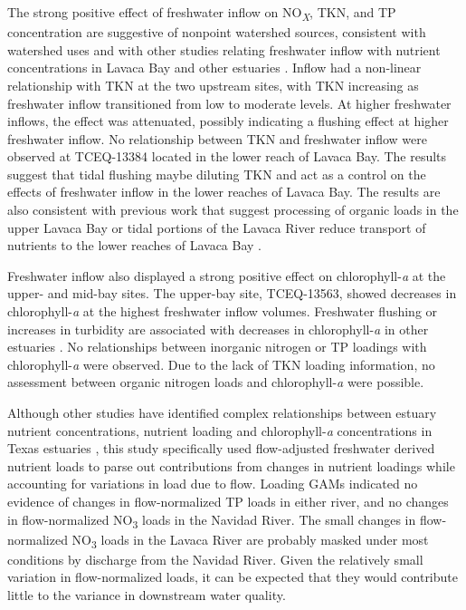 \documentclass[fleqn,10pt,lineno]{wlpeerj} %
\begin{document}
The strong positive effect of freshwater inflow on
NO\textsubscript{\emph{X}}, TKN, and TP concentration are suggestive of
nonpoint watershed sources, consistent with watershed uses and with
other studies relating freshwater inflow with nutrient concentrations in
Lavaca Bay and other estuaries
\autocite{russell_effect_2006,caffreyHighNutrientPulses2007,peierlsNonmonotonicResponsesPhytoplankton2012,palmerImpactsDroughtsLow2015,ciraPhytoplanktonDynamicsLowinflow2021}.
Inflow had a non-linear relationship with TKN at the two upstream sites,
with TKN increasing as freshwater inflow transitioned from low to
moderate levels. At higher freshwater inflows, the effect was
attenuated, possibly indicating a flushing effect at higher freshwater
inflow. No relationship between TKN and freshwater inflow were observed
at TCEQ-13384 located in the lower reach of Lavaca Bay. The results
suggest that tidal flushing maybe diluting TKN and act as a control on
the effects of freshwater inflow in the lower reaches of Lavaca Bay. The
results are also consistent with previous work that suggest processing
of organic loads in the upper Lavaca Bay or tidal portions of the Lavaca
River reduce transport of nutrients to the lower reaches of Lavaca Bay
\autocite{russell_effect_2006}.

Freshwater inflow also displayed a strong positive effect on
chlorophyll-\emph{a} at the upper- and mid-bay sites. The upper-bay
site, TCEQ-13563, showed decreases in chlorophyll-\emph{a} at the
highest freshwater inflow volumes. Freshwater flushing or increases in
turbidity are associated with decreases in chlorophyll-\emph{a} in other
estuaries
\autocite{peierlsNonmonotonicResponsesPhytoplankton2012,cloernPhytoplanktonPrimaryProduction2014}.
No relationships between inorganic nitrogen or TP loadings with
chlorophyll-\emph{a} were observed. Due to the lack of TKN loading
information, no assessment between organic nitrogen loads and
chlorophyll-\emph{a} were possible.

Although other studies have identified complex relationships between
estuary nutrient concentrations, nutrient loading and
chlorophyll-\emph{a} concentrations in Texas estuaries
\autocite{ornolfsdottirNutrientPulsingRegulator2004,doradoUnderstandingInteractionsFreshwater2015,ciraPhytoplanktonDynamicsLowinflow2021,tominackVariabilityPhytoplanktonBiomass2022},
this study specifically used flow-adjusted freshwater derived nutrient
loads to parse out contributions from changes in nutrient loadings while
accounting for variations in load due to flow. Loading GAMs indicated no
evidence of changes in flow-normalized TP loads in either river, and no
changes in flow-normalized NO\textsubscript{3} loads in the Navidad
River. The small changes in flow-normalized NO\textsubscript{3} loads in
the Lavaca River are probably masked under most conditions by discharge
from the Navidad River. Given the relatively small variation in
flow-normalized loads, it can be expected that they would contribute
little to the variance in downstream water quality.
\end{document}

